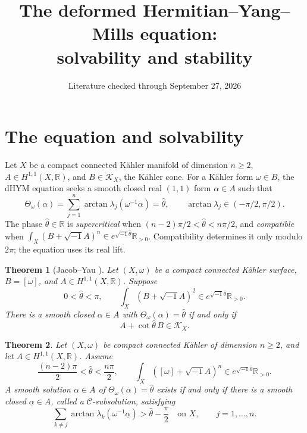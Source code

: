 \documentclass[12pt,reqno]{amsart}
\title{The deformed Hermitian--Yang--Mills equation:\\solvability and stability}
\date{Literature checked through September 27, 2026}
\numberwithin{equation}{section}
\theoremstyle{plain}
\newtheorem{theorem}{Theorem}[section]
\theoremstyle{definition}
\theoremstyle{remark}
\newcommand{\ii}{\sqrt{-1}}
\newcommand{\R}{\mathbb R}
\begin{document}
\maketitle

\section{The equation and solvability}\label{sec:intro}
Let $X$ be a compact connected K\"ahler manifold of dimension $n\ge2$,
$A\in H^{1,1}(X,\R)$, and $B\in\mathcal K_X$, the K\"ahler cone.
For a K\"ahler form $\omega\in B$, the dHYM equation seeks a smooth closed
real $(1,1)$ form $\alpha\in A$ such that
\[
 \Theta_\omega(\alpha)
 =\sum_{j=1}^n\arctan\lambda_j(\omega^{-1}\alpha)
 =\widehat\theta,
 \qquad \arctan\lambda_j\in(-\pi/2,\pi/2).
\]
The phase $\widehat\theta\in\R$ is \emph{supercritical} when
$(n-2)\pi/2<\widehat\theta<n\pi/2$, and \emph{compatible} when
$\int_X(B+\ii A)^n\in e^{\ii\widehat\theta}\R_{>0}$.
Compatibility determines it only modulo $2\pi$; the equation uses its real lift.

\begin{theorem}[Jacob--Yau \cite{JY}]\label{thm:surface}
Let $(X,\omega)$ be a compact connected K\"ahler surface, $B=[\omega]$, and $A\in H^{1,1}(X,\R)$. Suppose
\[
 0<\widehat\theta<\pi,\qquad
 \int_X(B+\ii A)^2\in e^{\ii\widehat\theta}\R_{>0}.
\]
There is a smooth closed $\alpha\in A$ with
$\Theta_\omega(\alpha)=\widehat\theta$ if and only if
\[
 A+\cot\widehat\theta\,B\in\mathcal K_X.
\]
\end{theorem}

\begin{theorem}\label{thm:subsolution}
Let $(X,\omega)$ be compact connected K\"ahler of dimension $n\ge2$, and let $A\in H^{1,1}(X,\R)$. Assume
\[
 \frac{(n-2)\pi}{2}<\widehat\theta<\frac{n\pi}{2},\qquad
 \int_X([\omega]+\ii A)^n\in e^{\ii\widehat\theta}\R_{>0}.
\]
A smooth solution $\alpha\in A$ of $\Theta_\omega(\alpha)=\widehat\theta$ exists if and only if there is a smooth closed $\underline\alpha\in A$, called a $\mathcal C$-subsolution, satisfying
\[
 \sum_{k\ne j}\arctan\lambda_k(\omega^{-1}\underline\alpha)
 >\widehat\theta-\frac\pi2
 \quad\text{on }X,\qquad j=1,\ldots,n.
\]
\end{theorem}
\end{document}
